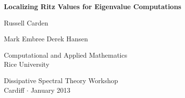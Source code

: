 \begin{frame}
\begin{center}
\LARGE{\bf Localizing Ritz Values for Eigenvalue Computations}\\[2em]

\Large

Russell Carden

Mark Embree \hspace*{1em} Derek Hansen

Computational and Applied Mathematics\\
Rice University

\vspace*{2em}

Dissipative Spectral Theory Workshop\\
Cardiff $\cdot$ January 2013
\end{center}

\end{frame}
